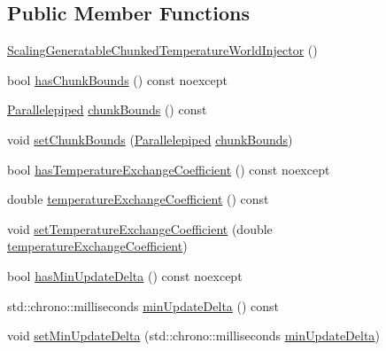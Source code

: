 \subsection*{Public Member Functions}
\begin{DoxyCompactItemize}
\item 
\hyperlink{class_scaling_generatable_chunked_temperature_world_injector_a14567261e979156ce64a7b045ad54742}{Scaling\-Generatable\-Chunked\-Temperature\-World\-Injector} ()
\item 
bool \hyperlink{class_scaling_generatable_chunked_temperature_world_injector_a55538a7bd833a485f7eb6700561d1e60}{has\-Chunk\-Bounds} () const noexcept
\item 
\hyperlink{struct_parallelepiped}{Parallelepiped} \hyperlink{class_scaling_generatable_chunked_temperature_world_injector_abc8b653a1857cf0cc9f1ab0321b40eef}{chunk\-Bounds} () const 
\item 
void \hyperlink{class_scaling_generatable_chunked_temperature_world_injector_a786fc4d04bd556c4b27645903cbfb77c}{set\-Chunk\-Bounds} (\hyperlink{struct_parallelepiped}{Parallelepiped} \hyperlink{class_scaling_generatable_chunked_temperature_world_injector_abc8b653a1857cf0cc9f1ab0321b40eef}{chunk\-Bounds})
\item 
bool \hyperlink{class_scaling_generatable_chunked_temperature_world_injector_a836ed2923893be64f7b8e785b2da6d83}{has\-Temperature\-Exchange\-Coefficient} () const noexcept
\item 
double \hyperlink{class_scaling_generatable_chunked_temperature_world_injector_a30555824cf848c809aceea16d01fc661}{temperature\-Exchange\-Coefficient} () const 
\item 
void \hyperlink{class_scaling_generatable_chunked_temperature_world_injector_ab06a2b915012e60d41b2db4cc77abbc4}{set\-Temperature\-Exchange\-Coefficient} (double \hyperlink{class_scaling_generatable_chunked_temperature_world_injector_a30555824cf848c809aceea16d01fc661}{temperature\-Exchange\-Coefficient})
\item 
bool \hyperlink{class_scaling_generatable_chunked_temperature_world_injector_ad49339454b5ace32d85ee7fd712548dd}{has\-Min\-Update\-Delta} () const noexcept
\item 
std\-::chrono\-::milliseconds \hyperlink{class_scaling_generatable_chunked_temperature_world_injector_ae9eb0a801e8a05dd7b8970f2c7677abe}{min\-Update\-Delta} () const 
\item 
void \hyperlink{class_scaling_generatable_chunked_temperature_world_injector_af495ed097d3ea85642df7702e6ae565e}{set\-Min\-Update\-Delta} (std\-::chrono\-::milliseconds \hyperlink{class_scaling_generatable_chunked_temperature_world_injector_ae9eb0a801e8a05dd7b8970f2c7677abe}{min\-Update\-Delta})

\end{DoxyCompactItemize}
